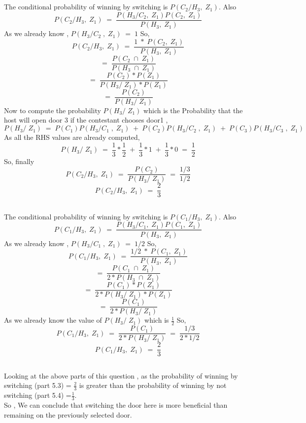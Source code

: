 \documentclass[11pt,a4paper,titlepage]{article}
\begin{document}
{{\subsection{}{
The conditional probability of winning by switching is $P(C_2/H_3,\; Z_1)$. Also
$$P(C_2/H_3,\; Z_1)\;=\; \frac{P(H_3/C_2, \;Z_1)P(C_2,\; Z_1)}{P(H_3,\; Z_1)}$$
As we already know , $P(H_3/C_2\;,\; Z_1)\;=\;1$ \;So,
$$P(C_2/H_3,\; Z_1)\;=\; \frac{1\;*\;P(C_2,\; Z_1)}{P(H_3,\; Z_1)}$$
$$=\; \frac{P(C_2\;\cap\; Z_1)}{P(H_3\;\cap\; Z_1)}$$
$$=\; \frac{P(C_2)*P( Z_1)}{P(H_3 /\;Z_1)*P(Z_1)}$$
$$=\; \frac{P(C_2)}{P(H_3 /\;Z_1)}$$
Now to compute the probability $P(H_3 /\;Z_1)$ which is the Probability that the host will open door 3 if the contestant chooses door1  , \\
$$P(H_3 /\;Z_1) \; =\;P(C_1)P(H_3/C_1\;,\; Z_1)\;+\;P(C_2)P(H_3/C_2\;,\; Z_1)\;+\;P(C_3)P(H_3/C_3\;,\; Z_1) $$
As all the RHS values are already computed,
$$P(H_3 /\;Z_1) \; =\;\frac{1}{3}*\frac{1}{2}\;+\;\frac{1}{3}*1\;+\;\frac{1}{3}*0\;=\;\frac{1}{2}$$
So, finally
$$P(C_2/H_3,\; Z_1)\;=\;\frac{P(C_2)}{P(H_3 /\;Z_1)} \;=\; \frac{1/3}{1/2} $$
$$P(C_2/H_3,\; Z_1)\;=\;\frac{2}{3}$$
}

\subsection{}{
The conditional probability of winning by switching is $P(C_1/H_3,\; Z_1)$. Also
$$P(C_1/H_3,\; Z_1)\;=\; \frac{P(H_3/C_1, \;Z_1)P(C_1,\; Z_1)}{P(H_3,\; Z_1)}$$
As we already know , $P(H_3/C_1\;,\; Z_1)\;=\;1/2$ \;So,
$$P(C_1/H_3,\; Z_1)\;=\; \frac{1/2\;*\;P(C_1,\; Z_1)}{P(H_3,\; Z_1)}$$
$$=\; \frac{P(C_1\;\cap\; Z_1)}{2*P(H_3\;\cap\; Z_1)}$$
$$=\; \frac{P(C_1)*P( Z_1)}{2*P(H_3 /\;Z_1)*P(Z_1)}$$
$$=\; \frac{P(C_1)}{2*P(H_3 /\;Z_1)}$$
As we already know the value of $P(H_3 /\;Z_1)$ which is $\frac{1}{2}$
So, 
$$P(C_1/H_3,\; Z_1)\;=\;\frac{P(C_1)}{2*P(H_3 /\;Z_1)} \;=\; \frac{1/3}{2*1/2} $$
$$P(C_1/H_3,\; Z_1)\;=\;\frac{2}{3}$$
}
\newpage
\subsection{}{
Looking at the above parts of this question , as the probability of winning by switching (part 5.3) = $\frac{2}{3}$ is greater than the probability of winning by not switching (part 5.4) =$\frac{1}{3}$.\\
So , We can conclude that switching the door here is more beneficial than remaining on the previously selected door.
}

}}
\end{document}
